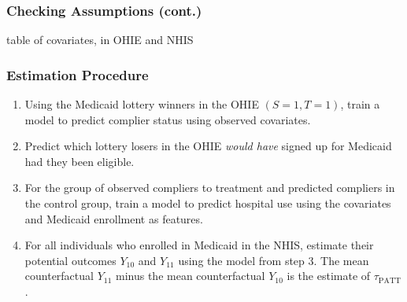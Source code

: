 \documentclass{beamer}
\begin{document}
\begin{frame}
\frametitle{Checking Assumptions (cont.)}
table of covariates, in OHIE and NHIS
\end{frame}


\begin{frame} %
\frametitle{Estimation Procedure}
\begin{enumerate}
\item Using the Medicaid lottery winners in the OHIE $(S=1, T=1)$, train a model to predict complier status using observed covariates.
\item Predict which lottery losers in the OHIE \textit{would have} signed up for Medicaid had they been eligible.
\item For the group of observed compliers to treatment and predicted compliers in the control group, train a model to predict hospital use using the covariates and Medicaid enrollment as features. 
\item For all individuals who enrolled in Medicaid in the NHIS, estimate their potential outcomes $Y_{10}$ and $Y_{11}$ using the model from step 3.  The mean counterfactual $Y_{11}$ minus the mean counterfactual $Y_{10}$ is the estimate of $\tau_{\text{PATT}}$.
\end{enumerate}
\end{frame}



\section[Results]{}

\end{document}
